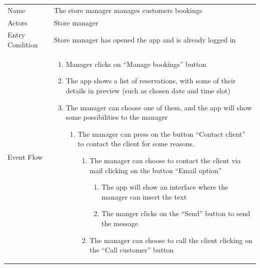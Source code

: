 \documentclass{article}
\newcommand\xrowht[2][0]
{\addstackgap[.5\dimexpr#2\relax]{\vphantom{#1}}}
\begin{document}
				\begin{center}
					
					
					\begin{adjustwidth}{-1.5cm}{}
						\begin{tabular}[h!]{|m{7.5em}|m{27.5em}|}
							\hline
							\xrowht{5pt}
							Name & The store manager manages customers bookings\\
							\xrowht{5pt}
							Actors & Store manager\\
							\xrowht{5pt}
							Entry Condition & Store manager has opened the app and is already logged in\\
							\xrowht{5pt}
							Event Flow & \begin{enumerate}
								
								\itemsep-0.25em
								\item Manager clicks on “Manage bookings” button
								\item The app shows a list of reservations, with some of their details in preview (such as chosen date and time slot)
								\item The manager can choose one of them, and the app will show some possibilities to the manager
								
								\begin{enumerate}
									
									\item The manager can press on the button “Contact client” to contact the client for some reasons.
									
									\begin{enumerate}
										
										\item The manager can choose to contact the client via mail clicking on the button “Email option”
										
										\begin{enumerate}
											
											\item The app will show an interface where the manager can insert the text
											\item The manger clicks on the “Send” button to send the message
											
										\end{enumerate}
									
										\item The manager can choose to call the client clicking on the “Call customer” button
										

\end{enumerate}
\end{enumerate}
\end{enumerate}
\end{tabular}
\end{adjustwidth}
\end{center}
\end{document}
